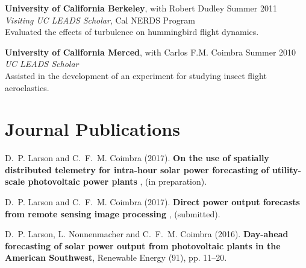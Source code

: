 \documentclass[]{res}
\begin{document}
\begin{resume}
\textbf{University of California Berkeley}, with Robert Dudley \hfill Summer 2011 \\
\textit{Visiting UC LEADS Scholar}, Cal NERDS Program \\
Evaluated the effects of turbulence on hummingbird flight dynamics.

\textbf{University of California Merced}, with Carlos F.M. Coimbra \hfill Summer 2010 \\
\textit{UC LEADS Scholar} \\
Assisted in the development of an experiment for studying insect flight aeroelastics.


%


\section{Journal Publications}
\vspace{0.1in}

D.~P. Larson and C.~F.~M. Coimbra (2017). \textbf{On the use of spatially distributed telemetry for intra-hour solar power forecasting of utility-scale photovoltaic power plants }, (in preparation).

D.~P. Larson and C.~F.~M. Coimbra (2017). \textbf{Direct power output forecasts from remote sensing image processing }, (submitted).

D.~P. Larson, L. Nonnenmacher and C.~F.~M. Coimbra (2016). \textbf{Day-ahead forecasting of solar power output from photovoltaic plants in the American Southwest}, Renewable Energy (91), pp. 11--20.



\end{resume}
\end{document}
